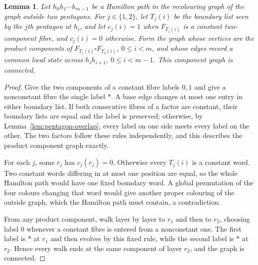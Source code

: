 \documentclass[11pt]{article}
\newtheorem{lemma}[theorem]{Lemma}
\theoremstyle{remark}
\numberwithin{equation}{section}
\numberwithin{table}{section}
\begin{document}
\begin{lemma}\label{lem:pentagon-component-graph}
Let $h_0h_1\cdots h_{m-1}$ be a Hamilton path in the
recolouring graph of the graph outside two pentagons.  For
$j\in\{1,2\}$, let $T_j(i)$ be the boundary list seen by the $j$th
pentagon at $h_i$, and let $c_j(i)=1$ when $F_{T_j(i)}$ is a constant
two-component fibre, and $c_j(i)=0$ otherwise.  Form the graph whose
vertices are the product components of
$F_{T_1(i)}\square F_{T_2(i)}$, $0\le i<m$, and whose edges record a
common local state across $h_ih_{i+1}$, $0\le i<m-1$.  This component
graph is connected.
\end{lemma}
\begin{proof}
Give the two components of a constant fibre labels $0,1$ and give a
nonconstant fibre the single label $\ast$.  A base edge changes at
most one entry in either boundary list.  If both consecutive fibres of
a factor are constant, their boundary lists are equal and the label is
preserved; otherwise, by Lemma~\ref{lem:pentagon-overlap}, every label
on one side meets every label on the other.  The two factors follow
these rules independently, and this describes the product component
graph exactly.

For each $j$, some $r_j$ has $c_j(r_j)=0$.  Otherwise every $T_j(i)$
is a constant word.  Two constant words differing in at most one
position are equal, so the whole Hamilton path would have one fixed
boundary word.  A global permutation of the four colours changing that
word would give another proper colouring of the outside graph, which
the Hamilton path must contain, a contradiction.

From any product component, walk layer by layer to $r_1$ and then to
$r_2$, choosing label $0$ whenever a constant fibre is entered from a
nonconstant one.  The first label is $\ast$ at $r_1$ and then evolves
by this fixed rule, while the second label is $\ast$ at $r_2$.  Hence
every walk ends at the same component of layer $r_2$, and the graph is
connected.
\end{proof}
\end{document}
